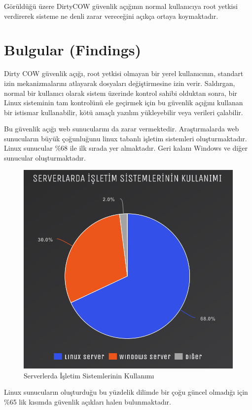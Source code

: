 \documentclass[conference, 12pt, a4paper]{IEEEtran}
\begin{document}
\begin{sloppypar}
    Görüldüğü üzere DirtyCOW güvenlik açığının normal kullanıcıya root yetkisi verdirerek sisteme ne denli zarar vereceğini açıkça ortaya koymaktadır.

\section{Bulgular (Findings)}
    Dirty COW güvenlik açığı, root yetkisi olmayan bir yerel kullanıcının, standart izin mekanizmalarını atlayarak dosyaları değiştirmesine izin verir. Saldırgan, normal bir kullanıcı olarak sistem üzerinde kontrol sahibi olduktan sonra, bir Linux sisteminin tam kontrolünü ele geçirmek için bu güvenlik açığını kullanan bir istismar kullanabilir, kötü amaçlı yazılım yükleyebilir veya verileri çalabilir.

    Bu güvenlik açığı web sunucularını da zarar vermektedir. Araştırmalarda web sunucuların büyük çoğunluğunu linux tabanlı işletim sistemleri oluşturmaktadır. Linux sunucular \%68 ile ilk sırada yer almaktadır. Geri kalanı Windows ve diğer sunucular oluşturmaktadır.

    \begin{figure}[htbp]
        \centering
        \includegraphics[scale=0.40]{server-grafik.png}
        \caption{Serverlerda İşletim Sistemlerinin Kullanımı}
    \end{figure}

    Linux sunucuların oluşturduğu bu yüzdelik dilimde bir çoğu güncel olmadığı için \%65 lik kısımda güvenlik açıkları halen bulunmaktadır.


\end{sloppypar}
\end{document}

